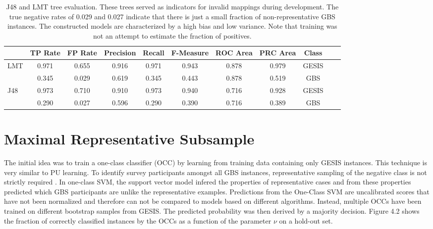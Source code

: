 \vspace{0.33cm}
\begin{table}[ht]
    \begin{center}
		\captionsetup{width= 430pt}
            {\footnotesize
            \begin{tabular}{l|cccccccccc}
                \hline \hline
                           &  TP Rate & FP Rate & Precision & Recall & F-Measure & ROC Area & PRC Area & Class \\
                \hline
                      LMT & 0.971 & 0.655 & 0.916 & 0.971 & 0.943 & 0.878 & 0.979 & GESIS\\
                      & 0.345 & 0.029 & 0.619 & 0.345 & 0.443 & 0.878 & 0.519 & GBS\\
                \hline \hline
    		 J48 & 0.973 & 0.710 & 0.910 & 0.973 & 0.940 & 0.716 & 0.928 & GESIS\\
                      & 0.290 & 0.027 & 0.596 & 0.290 & 0.390 & 0.716 & 0.389 & GBS\\
\end{tabular}}
        \caption{J48 and LMT tree evaluation. These trees served as indicators for invalid mappings during development. The true negative rates of 0.029 and 0.027 indicate that there is just a small fraction of non-representative GBS instances. The constructed models are characterized by a high bias and low variance. Note that training was not an attempt to estimate the fraction of positives.}
\end{center}
\end{table}

\section{Maximal Representative Subsample}

The initial idea was to train a one-class classifier (OCC) by learning from training data containing only GESIS instances. This technique is very similar to PU learning. To identify survey participants amongst all GBS instances, representative sampling of the negative class is not strictly required \cite{tax}. In one-class SVM, the support vector model infered the properties of representative cases and from these properties predicted which GBS participants are unlike the representative examples. Predictions from the One-Class SVM are uncalibrated scores that have not been normalized and therefore can not be compared to models based on different algorithms. Instead, multiple OCCs have been trained on different  bootstrap samples from GESIS. The predicted probability was then derived by a majority decision. Figure 4.2 shows the fraction of correctly classified instances by the OCCs as a function of the parameter \(\nu\) on a hold-out set.

